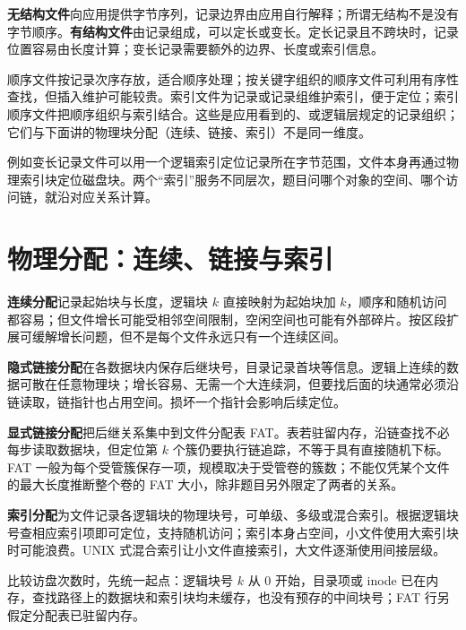 \textbf{无结构文件}向应用提供字节序列，记录边界由应用自行解释；所谓无结构不是没有字节顺序。\textbf{有结构文件}由记录组成，可以定长或变长。定长记录且不跨块时，记录位置容易由长度计算；变长记录需要额外的边界、长度或索引信息。

顺序文件按记录次序存放，适合顺序处理；按关键字组织的顺序文件可利用有序性查找，但插入维护可能较贵。索引文件为记录或记录组维护索引，便于定位；索引顺序文件把顺序组织与索引结合。这些是应用看到的、或逻辑层规定的记录组织；它们与下面讲的物理块分配（连续、链接、索引）不是同一维度。

例如变长记录文件可以用一个逻辑索引定位记录所在字节范围，文件本身再通过物理索引块定位磁盘块。两个``索引''服务不同层次，题目问哪个对象的空间、哪个访问链，就沿对应关系计算。

\section{物理分配：连续、链接与索引}\label{OS04-6-5}

\textbf{连续分配}记录起始块与长度，逻辑块 \(k\) 直接映射为起始块加 \(k\)，顺序和随机访问都容易；但文件增长可能受相邻空间限制，空闲空间也可能有外部碎片。按区段扩展可缓解增长问题，但不是每个文件永远只有一个连续区间。

\textbf{隐式链接分配}在各数据块内保存后继块号，目录记录首块等信息。逻辑上连续的数据可散在任意物理块；增长容易、无需一个大连续洞，但要找后面的块通常必须沿链读取，链指针也占用空间。损坏一个指针会影响后续定位。

\textbf{显式链接分配}把后继关系集中到文件分配表 FAT。表若驻留内存，沿链查找不必每步读取数据块，但定位第 \(k\) 个簇仍要执行链追踪，不等于具有直接随机下标。FAT 一般为每个受管簇保存一项，规模取决于受管卷的簇数；不能仅凭某个文件的最大长度推断整个卷的 FAT 大小，除非题目另外限定了两者的关系。

\textbf{索引分配}为文件记录各逻辑块的物理块号，可单级、多级或混合索引。根据逻辑块号查相应索引项即可定位，支持随机访问；索引本身占空间，小文件使用大索引块时可能浪费。UNIX 式混合索引让小文件直接索引，大文件逐渐使用间接层级。

比较访盘次数时，先统一起点：逻辑块号 \(k\) 从 0 开始，目录项或 inode 已在内存，查找路径上的数据块和索引块均未缓存，也没有预存的中间块号；FAT 行另假定分配表已驻留内存。

